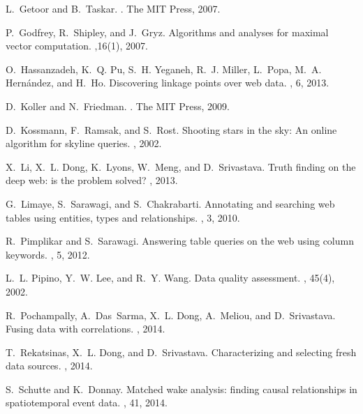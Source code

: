 \documentclass{sig-alternate}
\begin{document}
\begin{thebibliography}{10}
L.~Getoor and B.~Taskar.
.
\newblock The MIT Press, 2007.

P.~Godfrey, R.~Shipley, and J.~Gryz.
\newblock Algorithms and analyses for maximal vector computation.
,16(1), 2007.

O.~Hassanzadeh, K.~Q. Pu, S.~H. Yeganeh, R.~J. Miller, L.~Popa, M.~A.
  Hern{\'a}ndez, and H.~Ho.
\newblock Discovering linkage points over web data.
, 6, 2013.


D.~Koller and N.~Friedman.
.
\newblock The MIT Press, 2009.

D.~Kossmann, F.~Ramsak, and S.~Rost.
\newblock Shooting stars in the sky: An online algorithm for skyline queries.
, 2002.

X.~Li, X.~L. Dong, K.~Lyons, W.~Meng, and D.~Srivastava.
\newblock Truth finding on the deep web: is the problem solved?
, 2013.

G.~Limaye, S.~Sarawagi, and S.~Chakrabarti.
\newblock Annotating and searching web tables using entities, types and
  relationships.
, 3, 2010.

R.~Pimplikar and S.~Sarawagi.
\newblock Answering table queries on the web using column keywords.
, 5, 2012.

L.~L. Pipino, Y.~W. Lee, and R.~Y. Wang.
\newblock Data quality assessment.
, 45(4), 2002.

R.~Pochampally, A.~Das~Sarma, X.~L. Dong, A.~Meliou, and D.~Srivastava.
\newblock Fusing data with correlations.
, 2014.

T.~Rekatsinas, X.~L. Dong, and D.~Srivastava.
\newblock Characterizing and selecting fresh data sources.
, 2014.

S.~Schutte and K.~Donnay.
\newblock Matched wake analysis: finding causal relationships in spatiotemporal
  event data.
, 41, 2014.


\end{thebibliography}
\end{document}
